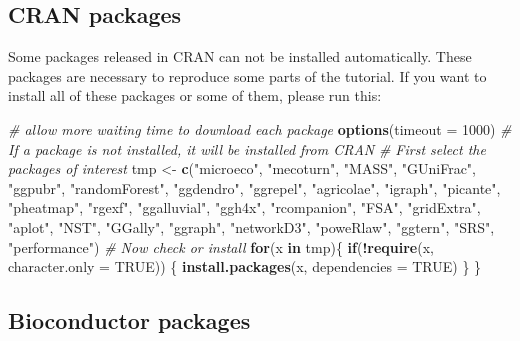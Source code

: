 \documentclass[
]{book}
\newenvironment{Shaded}{\begin{snugshade}}{\end{snugshade}}
\newcommand{\AttributeTok}[1]{\textcolor[rgb]{0.13,0.29,0.53}{#1}}
\newcommand{\CommentTok}[1]{\textcolor[rgb]{0.56,0.35,0.01}{\textit{#1}}}
\newcommand{\ConstantTok}[1]{\textcolor[rgb]{0.56,0.35,0.01}{#1}}
\newcommand{\ControlFlowTok}[1]{\textcolor[rgb]{0.13,0.29,0.53}{\textbf{#1}}}
\newcommand{\DecValTok}[1]{\textcolor[rgb]{0.00,0.00,0.81}{#1}}
\newcommand{\FunctionTok}[1]{\textcolor[rgb]{0.13,0.29,0.53}{\textbf{#1}}}
\newcommand{\NormalTok}[1]{#1}
\newcommand{\OtherTok}[1]{\textcolor[rgb]{0.56,0.35,0.01}{#1}}
\newcommand{\SpecialCharTok}[1]{\textcolor[rgb]{0.81,0.36,0.00}{\textbf{#1}}}
\newcommand{\StringTok}[1]{\textcolor[rgb]{0.31,0.60,0.02}{#1}}
\begin{document}
\subsection{CRAN packages}\label{cran-packages}

Some packages released in CRAN can not be installed automatically.
These packages are necessary to reproduce some parts of the tutorial.
If you want to install all of these packages or some of them, please run this:

\begin{Shaded}
\begin{Highlighting}[]
\CommentTok{\# allow more waiting time to download each package}
\FunctionTok{options}\NormalTok{(}\AttributeTok{timeout =} \DecValTok{1000}\NormalTok{)}
\CommentTok{\# If a package is not installed, it will be installed from CRAN}
\CommentTok{\# First select the packages of interest}
\NormalTok{tmp }\OtherTok{\textless{}{-}} \FunctionTok{c}\NormalTok{(}\StringTok{"microeco"}\NormalTok{, }\StringTok{"mecoturn"}\NormalTok{, }\StringTok{"MASS"}\NormalTok{, }\StringTok{"GUniFrac"}\NormalTok{, }\StringTok{"ggpubr"}\NormalTok{, }\StringTok{"randomForest"}\NormalTok{, }\StringTok{"ggdendro"}\NormalTok{, }\StringTok{"ggrepel"}\NormalTok{, }\StringTok{"agricolae"}\NormalTok{, }\StringTok{"igraph"}\NormalTok{, }\StringTok{"picante"}\NormalTok{, }\StringTok{"pheatmap"}\NormalTok{, }\StringTok{"rgexf"}\NormalTok{, }
    \StringTok{"ggalluvial"}\NormalTok{, }\StringTok{"ggh4x"}\NormalTok{, }\StringTok{"rcompanion"}\NormalTok{, }\StringTok{"FSA"}\NormalTok{, }\StringTok{"gridExtra"}\NormalTok{, }\StringTok{"aplot"}\NormalTok{, }\StringTok{"NST"}\NormalTok{, }\StringTok{"GGally"}\NormalTok{, }\StringTok{"ggraph"}\NormalTok{, }\StringTok{"networkD3"}\NormalTok{, }\StringTok{"poweRlaw"}\NormalTok{, }\StringTok{"ggtern"}\NormalTok{, }\StringTok{"SRS"}\NormalTok{, }\StringTok{"performance"}\NormalTok{)}
\CommentTok{\# Now check or install}
\ControlFlowTok{for}\NormalTok{(x }\ControlFlowTok{in}\NormalTok{ tmp)\{}
    \ControlFlowTok{if}\NormalTok{(}\SpecialCharTok{!}\FunctionTok{require}\NormalTok{(x, }\AttributeTok{character.only =} \ConstantTok{TRUE}\NormalTok{)) \{}
        \FunctionTok{install.packages}\NormalTok{(x, }\AttributeTok{dependencies =} \ConstantTok{TRUE}\NormalTok{)}
\NormalTok{    \}}
\NormalTok{\}}
\end{Highlighting}
\end{Shaded}

\subsection{Bioconductor packages}\label{bioconductor-packages}
\end{document}
